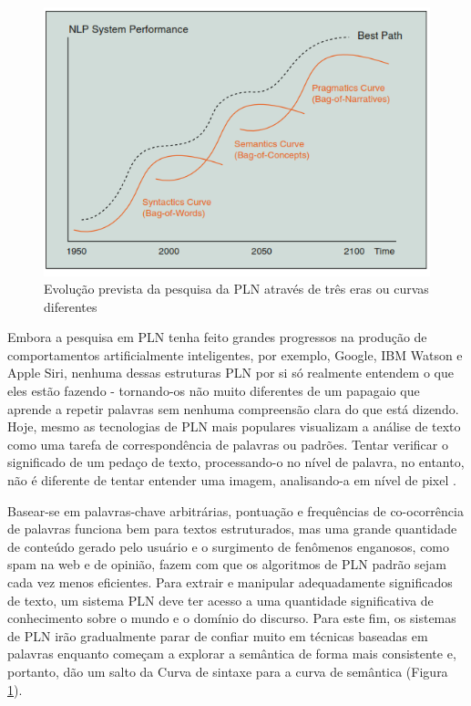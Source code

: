 \documentclass[
	12pt,				%
	openright,			%
	oneside,			%
	a4paper,			%
	english,			%
	spanish,			%
	brazil				%
	]{abntex2}
\begin{document}
\begin{figure}[H]
\centering
\includegraphics{NLPCurve}
\caption{Evolução prevista da pesquisa da \gls{PLN} através de três eras ou curvas diferentes \cite{book_Cambria2015}}
\label{NLPCurve}
\end{figure}


Embora a pesquisa em \gls{PLN} tenha feito grandes progressos na produção de comportamentos artificialmente inteligentes, por exemplo, Google, IBM Watson e Apple Siri, nenhuma dessas estruturas \gls{PLN} por si só realmente entendem o que eles estão fazendo - tornando-os não muito diferentes de um papagaio que aprende a repetir palavras sem nenhuma compreensão clara do que está dizendo. Hoje, mesmo as tecnologias de \gls{PLN} mais populares visualizam a análise de texto como uma tarefa de correspondência de palavras ou padrões. Tentar verificar o significado de um pedaço de texto, processando-o no nível de palavra, no entanto, não é diferente de tentar entender uma imagem, analisando-a em nível de pixel \cite{book_Cambria2015}. 

Basear-se em palavras-chave arbitrárias, pontuação e frequências de co-ocorrência de palavras funciona bem para textos estruturados, mas uma grande quantidade de conteúdo gerado pelo usuário e o surgimento de fenômenos enganosos, como spam na web e de opinião, fazem com que os algoritmos de \gls{PLN} padrão sejam cada vez menos eficientes. Para extrair e manipular adequadamente significados de texto, um sistema \gls{PLN} deve ter acesso a uma quantidade significativa de conhecimento sobre o mundo e o domínio do discurso.
Para este fim, os sistemas de \gls{PLN} irão gradualmente parar de confiar muito em técnicas baseadas em palavras enquanto começam a explorar a semântica de forma mais consistente e, portanto, dão um salto da Curva de sintaxe para a curva de semântica (Figura \ref{NLPCurve}).
\end{document}
